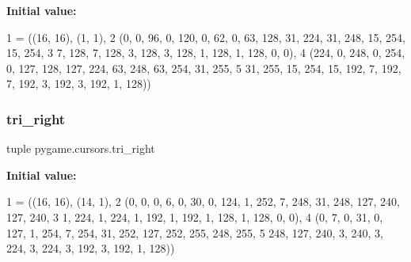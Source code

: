 {\bfseries Initial value\+:}
\begin{DoxyCode}
1 =  ((16, 16), (1, 1),
2     (0, 0, 96, 0, 120, 0, 62, 0, 63, 128, 31, 224, 31, 248, 15, 254, 15, 254,
3      7, 128, 7, 128, 3, 128, 3, 128, 1, 128, 1, 128, 0, 0),
4     (224, 0, 248, 0, 254, 0, 127, 128, 127, 224, 63, 248, 63, 254, 31, 255,
5      31, 255, 15, 254, 15, 192, 7, 192, 7, 192, 3, 192, 3, 192, 1, 128))
\end{DoxyCode}
\mbox{\label{namespacepygame_1_1cursors_a4713aff102abe2b2d27c5ebe1b853bcc}} 
\subsubsection{\texorpdfstring{tri\+\_\+right}{tri\_right}}
{\footnotesize\ttfamily tuple pygame.\+cursors.\+tri\+\_\+right}

{\bfseries Initial value\+:}
\begin{DoxyCode}
1 =  ((16, 16), (14, 1),
2     (0, 0, 0, 6, 0, 30, 0, 124, 1, 252, 7, 248, 31, 248, 127, 240, 127, 240,
3      1, 224, 1, 224, 1, 192, 1, 192, 1, 128, 1, 128, 0, 0),
4     (0, 7, 0, 31, 0, 127, 1, 254, 7, 254, 31, 252, 127, 252, 255, 248, 255,
5      248, 127, 240, 3, 240, 3, 224, 3, 224, 3, 192, 3, 192, 1, 128))
\end{DoxyCode}
